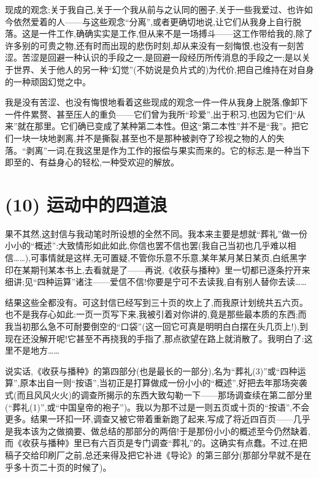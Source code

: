 %
现成的观念;关于我自己,关于一个我从前与之认同的圈子,关于一些我爱过、也许如今依然爱着的人——与这些观念“分离”,或者更确切地说,让它们从我身上自行脱落。这是一件工作,确确实实是工作,但从来不是一场搏斗——这工作带给我的,除了许多别的可贵之物,还有时而出现的悲伤时刻,却从来没有一刻悔恨,也没有一刻苦涩。苦涩是回避一种认识的手段之一,是回避一段经历所传消息的手段之一;是以关于世界、关于他人的另一种“幻觉”(不妨说是负片式的)为代价,把自己维持在对自身的一种顽固幻觉之中。

我是没有苦涩、也没有悔恨地看着这些现成的观念一件一件从我身上脱落,像卸下一件件累赘、甚至压人的重负——它们曾为我所“珍爱”,出于积习,也因为它们“从来”就在那里。它们确已变成了某种第二本性。但这“第二本性”并不是“我”。把它们一块一块地剥离,并不是撕裂,甚至也不是那种被剥夺了珍视之物的人的失落。“剥离”一词,在我这里是作为工作的报偿与果实而来的。它的标志,是一种当下即至的、有益身心的轻松,一种受欢迎的解放。

\section{(10) 运动中的四道浪}

果不其然,这封信与我动笔时所设想的全然不同。我本来主要是想就“葬礼”做一份小小的“概述”:大致情形如此如此,你信也罢不信也罢(我自己当初也几乎难以相信……),可事情就是这样,无可置疑,不管你乐意不乐意,某年某月某日某页,白纸黑字印在某期刊某本书上,去看就是了——再说,《收获与播种》里一切都已逐条拧开来细讲;见“四种运算”诸注——爱信不信!你要是宁可不去读我,自有别人替你去读……

结果这些全都没有。可这封信已经写到三十页的坎上了,而我原计划统共五六页。也不是我存心如此:一页一页写下来,我被引着对你讲的,竟是那些最本质的东西;而我当初那么急不可耐要倒空的“口袋”(这一回它可真是明明白白摆在头几页上!),到现在还没解开呢!它甚至不再挠我的手指了,那点欲望在路上就消散了。我明白了:这里不是地方……

说实话,《收获与播种》的第四部分(也是最长的一部分),名为“葬礼(3)”或“四种运算”,原本出自一则“按语”,当初正是打算做成一份小小的“概述”,好把去年那场突袭式(而且风风火火)的调查所揭示的东西大致勾勒一下——那场调查续在第二部分里(“葬礼(1)”,或“中国皇帝的袍子”)。我以为那不过是一则五页或十页的“按语”,不会更多。结果一环扣一环,调查又被它带着重新跑了起来,写成了将近四百页——几乎是我本该为之做摘要、做总结的那部分的两倍!于是那份小小的概述至今仍然缺着,而《收获与播种》里已有六百页是专门调查“葬礼”的。这确实有点蠢。不过,在把稿子交给印刷厂之前,总还来得及把它补进《导论》的第三部分(那部分早就不是在乎多十页二十页的时候了)。

